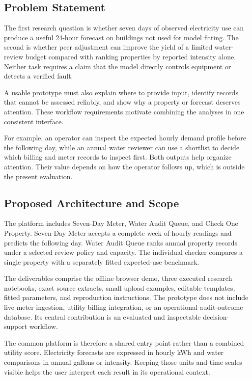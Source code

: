 \documentclass[12pt,a4paper]{article}
\begin{document}
\subsection{Problem Statement}
The first research question is whether seven days of observed electricity use can produce a useful 24-hour forecast on buildings not used for model fitting. The second is whether peer adjustment can improve the yield of a limited water-review budget compared with ranking properties by reported intensity alone. Neither task requires a claim that the model directly controls equipment or detects a verified fault.

A usable prototype must also explain where to provide input, identify records that cannot be assessed reliably, and show why a property or forecast deserves attention. These workflow requirements motivate combining the analyses in one consistent interface.

For example, an operator can inspect the expected hourly demand profile before the following day, while an annual water reviewer can use a shortlist to decide which billing and meter records to inspect first. Both outputs help organize attention. Their value depends on how the operator follows up, which is outside the present evaluation.

\subsection{Proposed Architecture and Scope}
The platform includes Seven-Day Meter, Water Audit Queue, and Check One Property. Seven-Day Meter accepts a complete week of hourly readings and predicts the following day. Water Audit Queue ranks annual property records under a selected review policy and capacity. The individual checker compares a single property with a separately fitted expected-use benchmark.

The deliverables comprise the offline browser demo, three executed research notebooks, exact source extracts, small upload examples, editable templates, fitted parameters, and reproduction instructions. The prototype does not include live meter ingestion, utility billing integration, or an operational audit-outcome database. Its central contribution is an evaluated and inspectable decision-support workflow.

The common platform is therefore a shared entry point rather than a combined utility score. Electricity forecasts are expressed in hourly kWh and water comparisons in annual gallons or intensity. Keeping those units and time scales visible helps the user interpret each result in its operational context.
\end{document}
